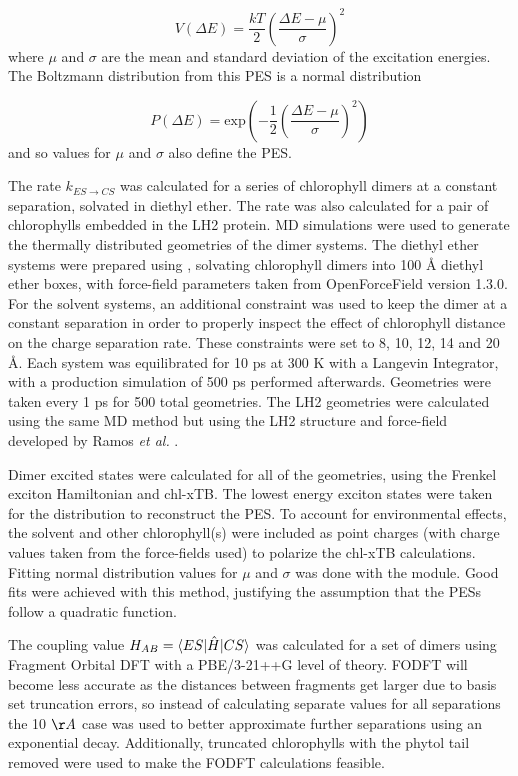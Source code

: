 \begin{equation}
    V\left(\Delta E\right) = \frac{kT}{2} \left( \frac{\Delta E - \mu}{\sigma}\right)^2
\end{equation}
%
where $\mu$ and $\sigma$ are the mean and standard deviation of the excitation energies.
The Boltzmann distribution from this PES is a normal distribution

\begin{equation}
    P\left(\Delta E\right) = \text{exp} \left(-\frac{1}{2}\left(\frac{\Delta E - \mu}{\sigma}\right)^2\right)
\end{equation}
%
and so values for $\mu$ and $\sigma$ also define the PES. 

The rate $k_{ES \rightarrow CS}$ was calculated for a series of chlorophyll dimers 
at a constant separation, solvated in diethyl ether. The rate was also calculated 
for a pair of chlorophylls embedded in the LH2 protein. MD simulations were used 
to generate  the thermally distributed geometries of the dimer systems. The diethyl
ether systems were prepared using , solvating chlorophyll dimers into 
100 \AA{} diethyl ether boxes, with force-field parameters taken from OpenForceField 
version 1.3.0. For the solvent systems, an additional constraint was used to keep 
the dimer at a constant separation in order to properly inspect the effect of chlorophyll
distance on the charge separation rate. These constraints were set to 8, 10, 12,
14 and 20 \AA{}. Each system was equilibrated for 10 ps at 300 K with a
Langevin Integrator, with a production simulation of 500 ps performed afterwards. 
Geometries were taken every 1 ps for 500 total geometries. The LH2 geometries were
calculated using the same MD method but using the LH2 structure and force-field developed
by Ramos \emph{et al.} \cite{Mennucci2019}.

Dimer excited states were calculated for all of the geometries, using the Frenkel
exciton Hamiltonian and chl-xTB. The lowest energy exciton states were taken for 
the distribution to reconstruct the PES. To account for environmental effects, the
solvent and other chlorophyll(s) were included as point charges (with charge values 
taken from the force-fields used) to polarize the chl-xTB calculations. Fitting normal
distribution values for $\mu$ and $\sigma$ was done with the  
module. Good fits were achieved with this method, justifying the assumption that 
the PESs follow a quadratic function.

The coupling value $H_{AB} = \braket{ES|\hat{H}|CS}$ was calculated for a set of
dimers using Fragment Orbital DFT with a PBE/3-21++G level of theory. FODFT will
become less accurate as the distances between fragments get larger due to basis
set truncation errors, so instead of calculating separate values for all separations
the 10 $\AA{}$ case was used to better approximate further separations using an
exponential decay. Additionally, truncated chlorophylls with the phytol tail removed
were used to make the FODFT calculations feasible.

